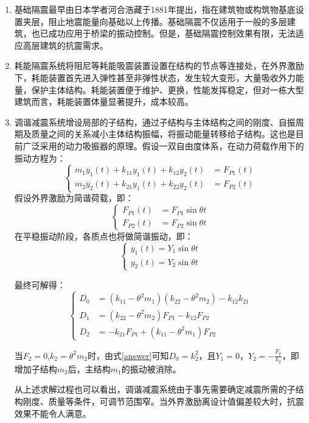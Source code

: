 \begin{enumerate}
	\item 基础隔震最早由日本学者河合浩藏于1881年提出，指在建筑物或构筑物基底设置夹层，阻止地震能量向基础以上传播。基础隔震不仅适用于一般的多层建筑，也已成功应用于桥梁的振动控制。但是，基础隔震控制效果有限，无法适应高层建筑的抗震需求\cite{Sun2012}。
	\item 耗能隔震系统将阻尼等耗能吸震装置设置在结构的节点等连接处，在外界激励下，耗能装置首先进入弹性甚至非弹性状态，发生较大变形，大量吸收外力能量，保护主体结构。耗能装置便于维护、更换，性能发挥稳定，但对一栋大型建筑而言，耗能装置体量显著提升，成本较高。
	\item 调谐减震系统增设局部的子结构，通过子结构与主体结构之间的刚度、自振周期及质量之间的关系减小主体结构振幅，将振动能量转移给子结构。这也是目前广泛采用的动力吸振器的原理。假设一双自由度体系，在动力荷载作用下的振动方程为：
	\begin{equation}
	\label{vibration}
	\left\{
	\begin{array}{rl}
	m_1\ddot{y_1}\left(t\right)+k_{11}y_1\left(t\right)+k_{12}y_2\left(t\right)&=F_{P1}\left(t\right)\\
	m_2\ddot{y_2}\left(t\right)+k_{21}y_1\left(t\right)+k_{22}y_2\left(t\right)&=F_{P2}\left(t\right)
	\end{array}
	\right.
	\end{equation}
	假设外界激励为简谐荷载，即：
	\begin{equation}
	\label{sin}
	\left\{
	\begin{array}{rl}
	F_{P1}\left(t\right)&=F_{P1}\sin \theta t\\
	F_{P2}\left(t\right)&=F_{P2}\sin \theta t
	\end{array}
	\right.
	\end{equation}
	在平稳振动阶段，各质点也将做简谐振动，即：
	\begin{equation}
	\label{sinMove}
	\left\{
	\begin{array}{rl}
	y_{1}\left(t\right)=Y_{1}\sin \theta t\\
	y_{2}\left(t\right)=Y_{2}\sin \theta t
	\end{array}
	\right.
	\end{equation}
	
	最终可解得：
	\begin{equation}
	\label{answer}
	\left\{
	\begin{array}{rl}
	D_0&=\left(k_{11}-\theta^2m_1\right)\left(k_{22}-\theta^2m_2\right)-k_{12}k_{21} \\
	D_1&=\left(k_{22}-\theta^2m_2\right)F_{P1}-k_{12}F_{P2} \\
	D_2&=-k_{21}F_{P1}+\left(k_{11}-\theta^2m_1\right)F_{P2}
	\end{array}
	\right.
	\end{equation}
	
	当$F_2=0$,$k_2=\theta^2m_2$时，由式\eqref{answer}可知$D_0=k_2^2$，且$Y_1=0$，$Y_2=-\frac{F_p}{k_2}$，即增加子结构$m_2$后，主结构$m_1$的振动被消除。
	
	从上述求解过程也可以看出，调谐减震系统由于事先需要确定减震所需的子结构刚度、质量等条件，可调节范围窄。当外界激励离设计值偏差较大时，抗震效果不能令人满意。
\end{enumerate}

